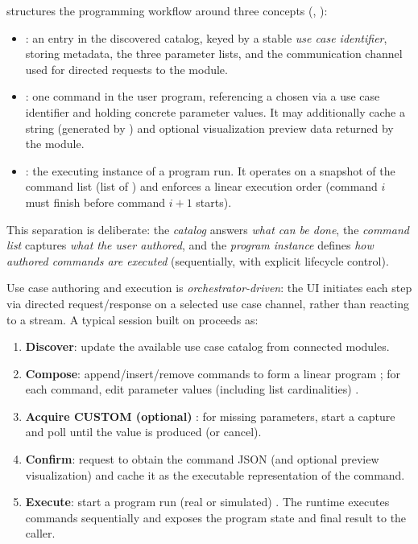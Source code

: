  structures the programming workflow around three concepts (, ):
\begin{itemize}
    \item {}: an entry in the discovered catalog, keyed by a stable \emph{use case identifier}, storing metadata, the three parameter lists, and the communication channel used for directed requests to the module.
    \item {}: one command in the user program, referencing a chosen  via a use case identifier and holding concrete parameter values. It may additionally cache a  string (generated by ) and optional visualization preview data returned by the module.
    \item {}: the executing instance of a program run. It operates on a snapshot of the command list (list of ) and enforces a linear execution order (command $i$ must finish before command $i{+}1$ starts).
\end{itemize}
This separation is deliberate: the \emph{catalog} answers \emph{what can be done}, the \emph{command list} captures \emph{what the user authored}, and the \emph{program instance} defines \emph{how authored commands are executed} (sequentially, with explicit lifecycle control).

Use case authoring and execution is \emph{orchestrator-driven}: the UI initiates each step via directed request/response on a selected use case channel, rather than reacting to a stream. A typical session built on  proceeds as:
\begin{enumerate}
    \item \textbf{Discover}: update the available use case catalog  from connected modules.
    \item \textbf{Compose}: append/insert/remove commands to form a linear program ; for each command, edit parameter values (including list cardinalities) .
    \item \textbf{Acquire CUSTOM (optional)} : for missing  parameters, start a capture and poll until the value is produced (or cancel).
    \item \textbf{Confirm}: request   to obtain the command JSON (and optional preview visualization) and cache it as the executable representation of the command.
    \item \textbf{Execute}: start a program run (real or simulated) . The runtime executes commands sequentially and exposes the program state and final result to the caller.
\end{enumerate}

